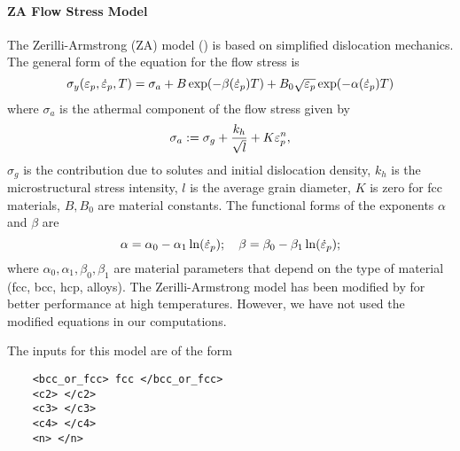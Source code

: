   \paragraph{ZA Flow Stress Model}
  The Zerilli-Armstrong (ZA) model (\cite{Zerilli87,Zerilli93,Zerilli04}) 
  is based on simplified dislocation mechanics.  The general form of the
  equation for the flow stress is
  \begin{equation}
    \sigma_y(\Ep,\Epdot{},T) = 
      \sigma_a + B\exp(-\beta(\Epdot{}) T) + 
                           B_0\sqrt{\Ep}\exp(-\alpha(\Epdot{}) T)
  \end{equation}
  where $\sigma_a$ is the athermal component of the flow stress given by
  \begin{equation}
    \sigma_a := \sigma_g + \frac{k_h}{\sqrt{l}} + K\Ep^n,
  \end{equation}
  $\sigma_g$ is the contribution due to solutes and initial dislocation
  density, $k_h$ is the microstructural stress intensity, $l$ is the 
  average grain diameter, $K$ is zero for fcc materials, 
  $B, B_0$ are material constants.  The functional forms of the exponents 
  $\alpha$ and $\beta$ are 
  \begin{equation}
    \alpha = \alpha_0 - \alpha_1 \ln(\Epdot{}); \quad
    \beta = \beta_0 - \beta_1 \ln(\Epdot{}); 
  \end{equation}
  where $\alpha_0, \alpha_1, \beta_0, \beta_1$ are material parameters that
  depend on the type of material (fcc, bcc, hcp, alloys).  The Zerilli-Armstrong
  model has been modified by \cite{Abed05} for better performance at high 
  temperatures.  However, we have not used the modified equations in our
  computations.

  The inputs for this model are of the form
  \begin{verbatim}
    <bcc_or_fcc> fcc </bcc_or_fcc>
    <c2> </c2>
    <c3> </c3>
    <c4> </c4>
    <n> </n>
  \end{verbatim}

